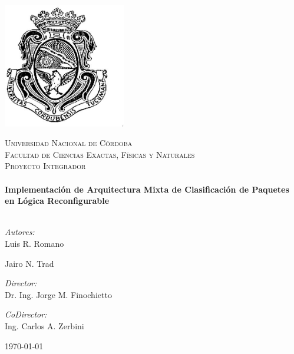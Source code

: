 
\begin{titlepage}
\begin{center}
\includegraphics[width=0.4\textwidth]{Logo-UNC.eps}

\textsc{\LARGE Universidad Nacional de Córdoba}\\[0.5cm]
\textsc{\Large Facultad de Ciencias Exactas, Físicas y Naturales}\\[1cm]
\textsc{\large Proyecto Integrador}\\[0.5cm]

\HRule \\[0.4cm]
{ \huge \bfseries Implementación de Arquitectura Mixta de Clasificación de Paquetes en Lógica Reconfigurable}\\[0.4cm]
\HRule \\[1.5cm]

\begin{minipage}{0.4\textwidth}
\begin{flushleft} \large
\emph{Autores:}\\
Luis R. Romano

Jairo N. Trad
\end{flushleft}
\end{minipage}
\begin{minipage}{0.43\textwidth}
\begin{flushright} \large
\emph{Director:} \\
 Dr. Ing. Jorge M. Finochietto

\emph{CoDirector:} \\
 Ing. Carlos A. Zerbini

\end{flushright}
\end{minipage}

\vfill

{\large \today}

\end{center}

\end{titlepage}
